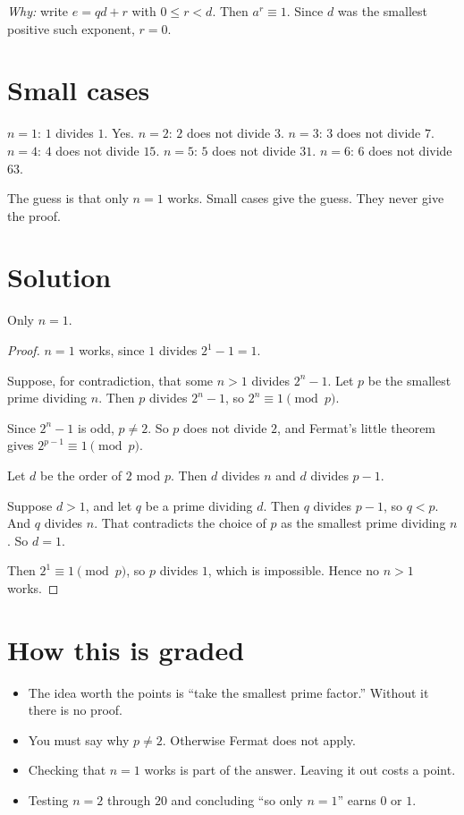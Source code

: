 \documentclass[11pt]{article}
\begin{document}
\emph{Why:} write $e = qd + r$ with $0 \le r < d$. Then $a^r \equiv 1$. Since $d$ was the smallest positive such exponent, $r = 0$.

\section*{Small cases}
$n = 1$: $1$ divides $1$. Yes. \quad $n = 2$: $2$ does not divide $3$. \quad $n = 3$: $3$ does not divide $7$. \quad $n = 4$: $4$ does not divide $15$. \quad $n = 5$: $5$ does not divide $31$. \quad $n = 6$: $6$ does not divide $63$.

The guess is that only $n = 1$ works. Small cases give the guess. They never give the proof.

\section*{Solution}
\begin{answer}
Only $n = 1$.
\end{answer}
\begin{proof}
$n = 1$ works, since $1$ divides $2^1 - 1 = 1$.

Suppose, for contradiction, that some $n > 1$ divides $2^n - 1$. Let $p$ be the smallest prime dividing $n$. Then $p$ divides $2^n - 1$, so $2^n \equiv 1 \pmod p$.

Since $2^n - 1$ is odd, $p \ne 2$. So $p$ does not divide $2$, and Fermat's little theorem gives $2^{p-1} \equiv 1 \pmod p$.

Let $d$ be the order of $2$ mod $p$. Then $d$ divides $n$ and $d$ divides $p - 1$.

Suppose $d > 1$, and let $q$ be a prime dividing $d$. Then $q$ divides $p - 1$, so $q < p$. And $q$ divides $n$. That contradicts the choice of $p$ as the smallest prime dividing $n$. So $d = 1$.

Then $2^1 \equiv 1 \pmod p$, so $p$ divides $1$, which is impossible. Hence no $n > 1$ works.
\end{proof}

\section*{How this is graded}
\begin{itemize}
  \item The idea worth the points is ``take the smallest prime factor.'' Without it there is no proof.
  \item You must say why $p \ne 2$. Otherwise Fermat does not apply.
  \item Checking that $n = 1$ works is part of the answer. Leaving it out costs a point.
  \item Testing $n = 2$ through $20$ and concluding ``so only $n = 1$'' earns $0$ or $1$.
\end{itemize}
\end{document}
